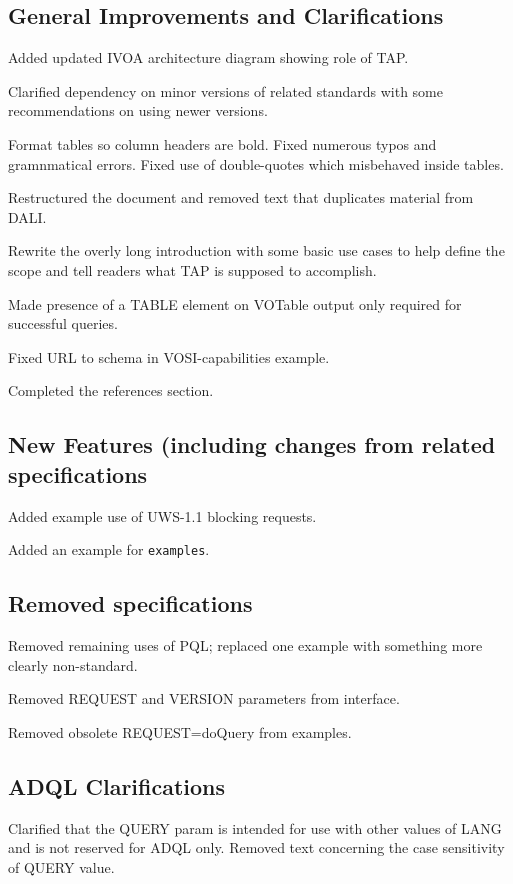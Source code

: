 \documentclass[11pt,letter]{ivoa}
\begin{document}
\subsection{General Improvements and Clarifications}

Added updated IVOA architecture diagram showing role of TAP.

Clarified dependency on minor versions of related standards with some recommendations on
using newer versions.

Format tables so column headers are bold. Fixed numerous typos and gramnmatical errors. Fixed use of double-quotes which misbehaved inside tables. 

Restructured the document and removed text that duplicates material from DALI. 

Rewrite the overly long introduction with some basic use cases to help define 
the scope and tell readers what TAP is supposed to accomplish.

Made presence of a TABLE element on VOTable output only required for 
successful queries.

Fixed URL to schema in VOSI-capabilities example.

Completed the references section.

\subsection{New Features (including changes from related specifications}

Added example use of UWS-1.1 blocking requests.

Added an example for \verb|examples|.

\subsection{Removed specifications}

Removed remaining uses of PQL; replaced one example with something more clearly non-standard.

Removed REQUEST and VERSION parameters from interface.

Removed obsolete REQUEST=doQuery from examples.

\subsection{ADQL Clarifications}

Clarified that the QUERY param is intended for use with other values of LANG and is not
reserved for ADQL only. Removed text concerning the case sensitivity of QUERY value.
\end{document}
